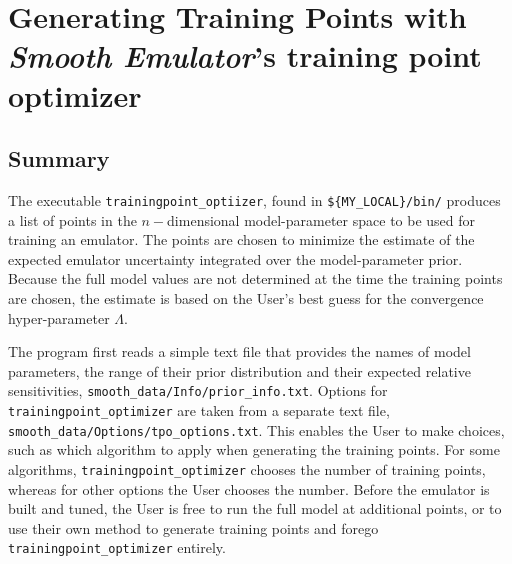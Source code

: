 \documentclass[UserManual.tex]{subfiles}
\begin{document}
\setcounter{section}{2}

\section{Generating Training Points with {\it Smooth Emulator}'s training point optimizer}\label{sec:tpo}

\subsection{Summary}
The executable {\tt trainingpoint\_optiizer}, found in {\tt \$\{MY\_LOCAL\}/bin/} produces a list of points in the $n-$dimensional model-parameter space to be used for training an emulator. The points are chosen to minimize the estimate of the expected emulator uncertainty integrated over the model-parameter prior. Because the full model values are not determined at the time the training points are chosen, the estimate is based on the User's best guess for the convergence hyper-parameter $\Lambda$. 

The program first reads a simple text file that provides the names of model parameters, the range of their prior distribution and their expected relative sensitivities, {\tt smooth\_data/Info/prior\_info.txt}. Options for {\tt trainingpoint\_optimizer} are taken from a separate text file, {\tt smooth\_data/Options/tpo\_options.txt}. This enables the User to make choices, such as which algorithm to apply when generating the training points. For some algorithms, {\tt trainingpoint\_optimizer} chooses the number of training points, whereas for other options the User chooses the number. Before the emulator is built and tuned, the User is free to run the full model at additional points, or to use their own method to generate training points and forego {\tt trainingpoint\_optimizer} entirely.
\end{document}
